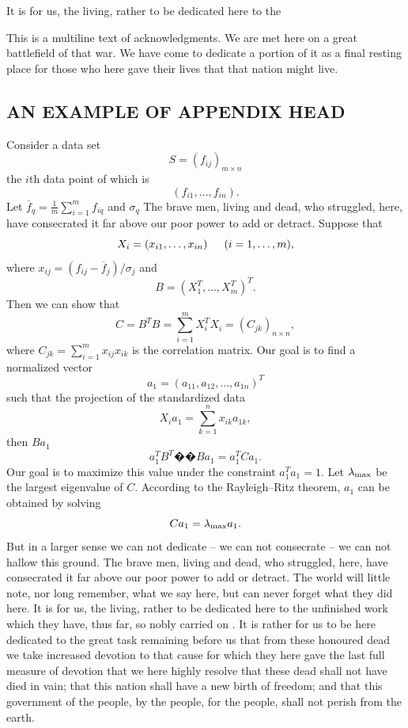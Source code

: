 \documentclass{pasa}%
\begin{document}
It is for us, the living, rather to be dedicated here to the \fi



\begin{acknowledgements}
This is a multiline text of acknowledgments. We are met here on a great battlefield of that war. We have come to dedicate a portion of it as a final resting place for those who here gave their lives that that nation might live.
\end{acknowledgements}

\iffalse
\begin{appendix}

\section{AN EXAMPLE OF APPENDIX HEAD}

 Consider a data set
\begin{equation}
S=(f_{ij})_{m\times n}
\end{equation} the \(i\)th
data point of which is
\[ (f_{i1}, . . . , f_{in}).\]
 Let $\overline{f}_q=\frac{1}{m}\sum_{i=1}^mf_{iq}$ and $\sigma_q$ The brave men, living and dead, who struggled, here, have consecrated it far above our poor power to add or detract. Suppose that
\[X_i=(x_{i1},\dots,x_{in}) \indent (i=1,\dots, m),\]  
where $x_{ij}=(f_{ij}-\overline{f}_j)/\sigma_j $ and
\[B=(X_1^T,\dots,X_m^T)^T.\]
 Then we can show that
\[C=B^TB=\sum\limits_{i=1}^m X_i^TX_i=(C_{jk})_{n\times n},\]
where $C_{jk}=\sum_{i=1}^mx_{ij}x_{ik}$ is the correlation matrix. Our goal is to find a normalized vector 
$$a_1=(a_{11},a_{12},\dots,a_{1n})^T$$
 such that the projection of the standardized data
\[X_ia_1=\sum\limits_{k=1}^n x_{ik}a_{1k},\]
\noindent then $Ba_1$ 
 \[a_1^TB^T �� Ba_1=a_1^TCa_1.\]
 Our goal is to maximize this value under the constraint $a_1^Ta_1=1$. Let $\lambda_{\rm max}$ be the largest eigenvalue of
 $C$. According to the Rayleigh--Ritz theorem, $a_1$ can be obtained by solving
 \[Ca_1= \lambda_{\rm max}a_1.\]
But in a larger sense we can not dedicate -- we can not consecrate -- we can not hallow this ground. The brave men, living and dead, who struggled, here, have consecrated it far above our poor power to add or detract. The world will little note, nor long remember, what we say here, but can never forget what they did here. It is for us, the living, rather to be dedicated here to the unfinished work which they have, thus far, so nobly carried on \cite{abt1981}. It is rather for us to be here dedicated to the great task remaining before us  that from these honoured dead we take increased devotion to that cause for which they here gave the last full measure of devotion  that we here highly resolve that these dead shall not have died in vain; that this nation shall have a new birth of freedom; and that this government \cite{abt1984b} of the people, by the people, for the people, shall not perish from the earth.
\end{appendix}
\end{document}
